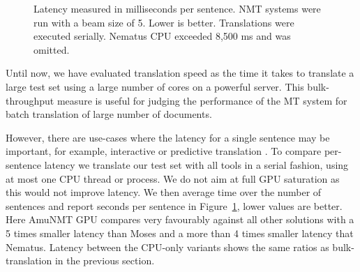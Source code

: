 \documentclass[11pt]{article}
\begin{document}
\begin{figure}[t]
\centering
{}
\caption{Latency measured in milliseconds per sentence. NMT systems were run with a beam size of 5. Lower is better. Translations were executed serially. Nematus CPU exceeded 8,500 ms and was omitted.}\label{latency}
\end{figure}

Until now, we have evaluated translation speed as the time it takes to translate a large test set using a large number of cores on a powerful server. This bulk-throughput measure is useful for judging the performance of the MT system for batch translation of large number of documents.
 
However, there are use-cases where the latency for a single sentence may be important, for example, interactive or predictive translation \cite{Knowles}. %
To compare per-sentence latency we translate our test set with all tools in a serial fashion, using at most one CPU thread or process. We do not aim at full GPU saturation as this would not improve latency. We then average time over the number of sentences and report seconds per sentence in Figure~\ref{latency}, lower values are better. Here AmuNMT GPU compares very favourably against all other solutions with a 5 times smaller latency than Moses and a more than 4 times smaller latency that Nematus. Latency between the CPU-only variants shows the same ratios as bulk-translation in the previous section. %
\end{document}
